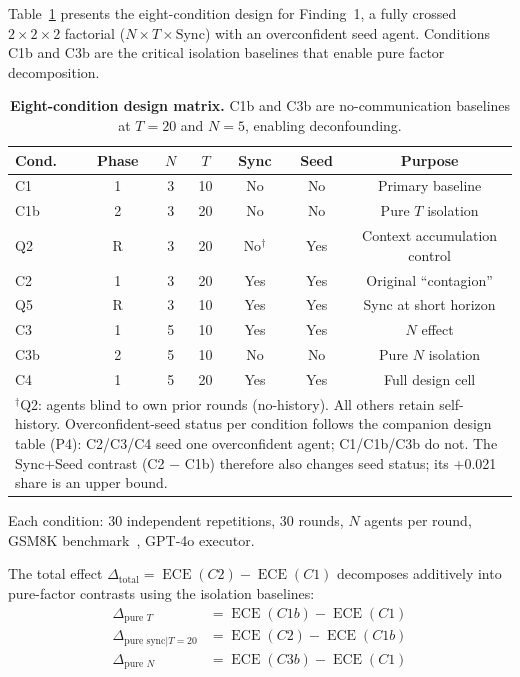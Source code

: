 \documentclass[11pt]{article}
\DeclareMathOperator{\ECE}{ECE}
\begin{document}
Table~\ref{tab:design} presents the eight-condition design for Finding~1, a fully crossed $2 \times 2 \times 2$ factorial ($N \times T \times \text{Sync}$) with an overconfident seed agent. Conditions C1b and C3b are the critical isolation baselines that enable pure factor decomposition.

\begin{table}[H]
\centering
\caption{\textbf{Eight-condition design matrix.} C1b and C3b are no-communication baselines at $T{=}20$ and $N{=}5$, enabling deconfounding.}
\label{tab:design}
\begin{tabular}{@{}lcccccc@{}}
\toprule
Cond. & Phase & $N$ & $T$ & Sync & Seed & Purpose \\
\midrule
C1  & 1 & 3 & 10 & No  & No  & Primary baseline \\
C1b & 2 & 3 & 20 & No  & No  & Pure $T$ isolation \\
Q2  & R & 3 & 20 & No$^\dagger$ & Yes & Context accumulation control \\
C2  & 1 & 3 & 20 & Yes & Yes & Original ``contagion'' \\
Q5  & R & 3 & 10 & Yes & Yes & Sync at short horizon \\
C3  & 1 & 5 & 10 & Yes & Yes & $N$ effect \\
C3b & 2 & 5 & 10 & No  & No  & Pure $N$ isolation \\
C4  & 1 & 5 & 20 & Yes & Yes & Full design cell \\
\bottomrule
\multicolumn{7}{l}{\footnotesize $^\dagger$Q2: agents blind to own prior rounds (no-history). All others retain self-history. Overconfident-seed status per condition follows the companion design table (P4): C2/C3/C4 seed one overconfident agent; C1/C1b/C3b do not. The Sync+Seed contrast (C2 $-$ C1b) therefore also changes seed status; its +0.021 share is an upper bound.} \\
\end{tabular}
\end{table}

Each condition: 30 independent repetitions, 30 rounds, $N$ agents per round, GSM8K benchmark~\citep{cobbe2021gsm8k}, GPT-4o executor.

The total effect $\Delta_{\text{total}} = \ECE(C2) - \ECE(C1)$ decomposes additively into pure-factor contrasts using the isolation baselines:
\begin{align}
    \Delta_{\text{pure } T} &= \ECE(C1b) - \ECE(C1) \\
    \Delta_{\text{pure sync}|T=20} &= \ECE(C2) - \ECE(C1b) \\
    \Delta_{\text{pure } N} &= \ECE(C3b) - \ECE(C1)
\end{align}
\end{document}
